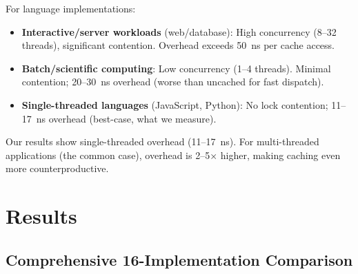 \documentclass[sigplan,final]{acmart}
\begin{document}
For language implementations:

\begin{itemize}
  \item \textbf{Interactive/server workloads} (web/database): High concurrency (8--32 threads),
    significant contention. Overhead exceeds 50~ns per cache access.

  \item \textbf{Batch/scientific computing}: Low concurrency (1--4 threads).
    Minimal contention; 20--30~ns overhead (worse than uncached for fast dispatch).

  \item \textbf{Single-threaded languages} (JavaScript, Python): No lock contention;
    11--17~ns overhead (best-case, what we measure).
\end{itemize}

Our results show single-threaded overhead (11--17~ns). For multi-threaded applications (the
common case), overhead is 2--5× higher, making caching even more counterproductive.

\section{Results}

\subsection{Comprehensive 16-Implementation Comparison}
\end{document}
